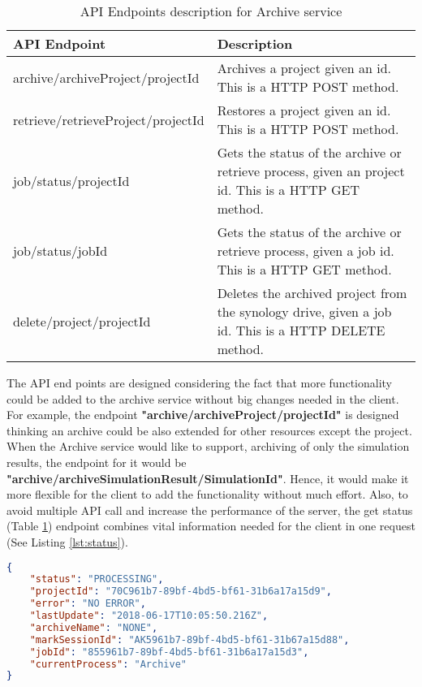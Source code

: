     \begin{table}[H]
        \centering
        \begin{tabular}{|p{6cm}|p{8cm}|}
            \hline
                \textbf{API Endpoint}&\textbf{Description}\\
            \hline
                archive/archiveProject/{{projectId}} & Archives a project given an id. This is a HTTP POST method.\\
            \hline
                retrieve/retrieveProject/{{projectId}} & Restores a project given an id. This is a HTTP POST method.\\
            \hline
                job/status/{{projectId}} & Gets the status of the archive or retrieve process, given an project id. This is a HTTP GET method.\\
            \hline
                job/status/{{jobId}} & Gets the status of the archive or retrieve process, given a job id. This is a HTTP GET method.\\
            \hline
                delete/project/{{projectId}} & Deletes the archived project from the synology drive, given a job id. This is a HTTP DELETE method.\\
            \hline
        \end{tabular}
        \caption{API Endpoints description for Archive service}
        \label{table:archiveEndpoints}     
    \end{table}  

    The API end points are designed considering the fact that more functionality could be added to the archive service without big changes needed in the client. 
    For example, the endpoint \textbf{"archive/archiveProject/{{projectId}}"} is designed thinking an archive could be also extended for other resources except the project. When
    the Archive service would like to support, archiving of only the simulation results, the endpoint for it would be \textbf{"archive/archiveSimulationResult/{{SimulationId}}"}.
    Hence, it would make it more flexible for the client to add the functionality without much effort. Also, to avoid multiple API call and
    increase the performance of the server, the get status (Table \ref{table:archiveEndpoints}) endpoint combines vital information needed for the client in one 
    request (See Listing \ref{lst:status}). 
    
\begin{lstlisting}[caption={Sucessful GET request for a archive status}, language=json,firstnumber=1, captionpos=b, label={lst:status}]
{
    "status": "PROCESSING",
    "projectId": "70C961b7-89bf-4bd5-bf61-31b6a17a15d9",
    "error": "NO ERROR",
    "lastUpdate": "2018-06-17T10:05:50.216Z",
    "archiveName": "NONE",
    "markSessionId": "AK5961b7-89bf-4bd5-bf61-31b67a15d88",
    "jobId": "855961b7-89bf-4bd5-bf61-31b6a17a15d3",
    "currentProcess": "Archive"
}
\end{lstlisting}







    
